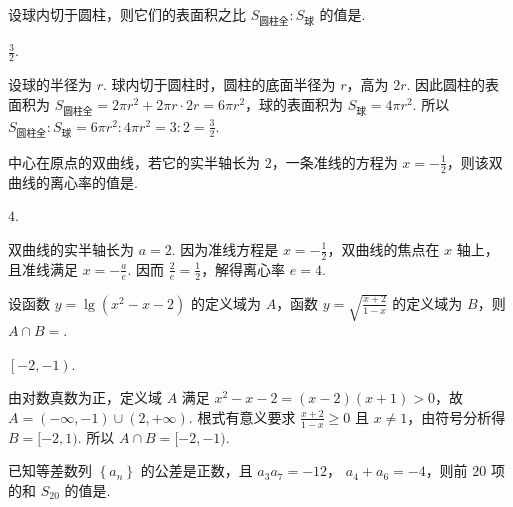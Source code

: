 \begin{problem}

设球内切于圆柱，则它们的表面积之比 \(S_{\text{圆柱全}} : S_{\text{球}} \) 的值是\fillinblank{}.
\end{problem}

\begin{answer}
\(\frac{3}{2} \).
\end{answer}

\begin{solution}
设球的半径为 \(r\). 球内切于圆柱时，圆柱的底面半径为 \(r\)，高为 \(2r\). 因此圆柱的表面积为 \(S_{\text{圆柱全}}=2\pi r^2+2\pi r\cdot2r=6\pi r^2\)，球的表面积为 \(S_{\text{球}}=4\pi r^2\). 所以 \(S_{\text{圆柱全}}:S_{\text{球}}=6\pi r^2:4\pi r^2=3:2=\frac32\).
\end{solution}

\begin{problem}

中心在原点的双曲线，若它的实半轴长为 \(2\)，一条准线的方程为 \(x = -\frac{1}{2} \)，则该双曲线的离心率的值是\fillinblank{}.
\end{problem}

\begin{answer}
\(4\).
\end{answer}

\begin{solution}
双曲线的实半轴长为 \(a=2\). 因为准线方程是 \(x=-\frac12\)，双曲线的焦点在 \(x\) 轴上，且准线满足 \(x=-\frac{a}{e}\). 因而 \(\frac{2}{e}=\frac12\)，解得离心率 \(e=4\).
\end{solution}

\begin{problem}

设函数 \(y = \lg(x^2 - x - 2) \) 的定义域为 \(A\)，函数 \(y = \sqrt{\frac{x + 2}{1 - x}} \) 的定义域为 \(B\)，则 \(A \cap B = \)\fillinblank{}.
\end{problem}

\begin{answer}
\(\left[-2,-1\right) \).
\end{answer}

\begin{solution}
由对数真数为正，定义域 \(A\) 满足 \(x^2-x-2=(x-2)(x+1)>0\)，故 \(A=(-\infty,-1)\cup(2,+\infty)\). 根式有意义要求 \(\frac{x+2}{1-x}\geq0\) 且 \(x\ne1\)，由符号分析得 \(B=[-2,1)\). 所以 \(A\cap B=[-2,-1)\).
\end{solution}

\begin{problem}

已知等差数列 \(\left\{a_{n}\right\} \) 的公差是正数，且 \(a_{3} a_{7} = -12 \)， \(a_{4} + a_{6} = -4 \)，则前 \(20\) 项的和 \(S_{20}\) 的值是\fillinblank{}.
\end{problem}

